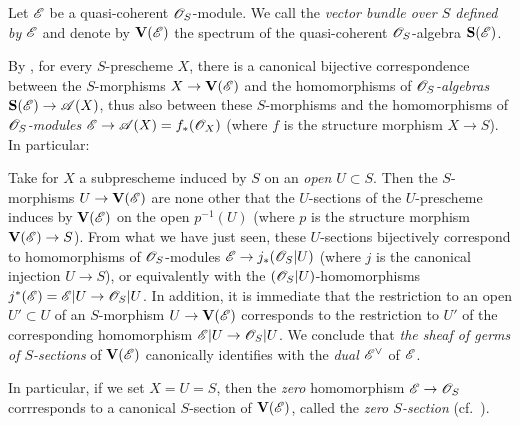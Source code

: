 \begin{definition}[1.7.8]
\label{2.1.7.8}
Let $\mathscr{E}$ be a quasi-coherent $\mathscr{O}_S$-module.
We call the \emph{vector bundle over $S$ defined by $\mathscr{E}$} and denote by $\mathbf{V}(\mathscr{E})$ the spectrum  of the quasi-coherent $\mathscr{O}_S$-algebra $\mathbf{S}(\mathscr{E})$.
\end{definition}

By , for every $S$-prescheme $X$, there is a canonical bijective correspondence between the $S$-morphisms $X\to\bb{V}(\sh{E})$ and the homomorphisms of \emph{$\mathscr{O}_S$-algebras $\bb{S}(\sh{E})\to\sh{A}(X)$}, thus also between these $S$-morphisms and the homomorphisms of \emph{$\mathscr{O}_S$-modules $\sh{E}\to\sh{A}(X)=f_*(\sh{O}_X)$} (where $f$ is the structure morphism $X\to S$).
In particular:
\begin{env}[1.7.9]
\label{2.1.7.9}
Take for $X$ a subprescheme induced by $S$ on an \emph{open $U\subset S$}.
Then the $S$-morphisms $U\to\bb{V}(\sh{E})$ are none other that the $U$-sections  of the $U$-prescheme induces by $\mathbf{V}(\mathscr{E})$ on the open $p^{-1}(U)$ (where $p$ is the structure morphism $\bb{V}(\sh{E})\to S$).
From what we have just seen, these $U$-sections bijectively correspond to homomorphisms of $\mathscr{O}_S$-modules $\sh{E}\to j_*(\sh{O}_S|U)$ (where $j$ is the canonical injection $U\to S$), or
equivalently  with the $(\mathscr{O}_S|U)$-homomorphisms $j^*(\sh{E})=\sh{E}|U\to\sh{O}_S|U$.
In addition, it is immediate that the restriction to an open $U'\subset U$ of an $S$-morphism $U\to\bb{V}(\sh{E})$ corresponds to the restriction to $U'$ of the corresponding homomorphism $\sh{E}|U\to\sh{O}_S|U$.
We conclude that \emph{the sheaf of germs of $S$-sections} of $\mathbf{V}(\mathscr{E})$ canonically identifies with the \emph{dual ${\mathscr{E}}^\vee$} of $\mathscr{E}$.

In particular, if we set $X=U=S$, then the \emph{zero} homomorphism $\sh{E}\to\sh{O}_S$ corrresponds to a canonical $S$-section of $\mathbf{V}(\mathscr{E})$, called the \emph{zero $S$-section} (cf.~).
\end{env}

